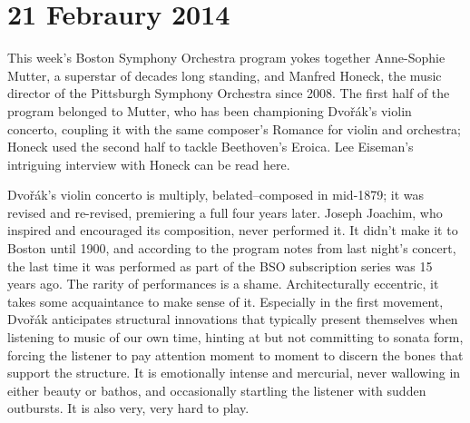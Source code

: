 \chapter{21 Febraury 2014}

This week’s Boston Symphony Orchestra program yokes together Anne-Sophie Mutter, a superstar of decades long standing, and Manfred Honeck, the music director of the Pittsburgh Symphony Orchestra since 2008. The first half of the program belonged to Mutter, who has been championing Dvořák’s violin concerto, coupling it with the same composer’s Romance for violin and orchestra; Honeck used the second half to tackle Beethoven’s Eroica. Lee Eiseman’s intriguing interview with Honeck can be read here.

Dvořák’s violin concerto is multiply, belated–composed in mid-1879; it was revised and re-revised, premiering a full four years later. Joseph Joachim, who inspired and encouraged its composition, never performed it. It didn’t make it to Boston until 1900, and according to the program notes from last night’s concert, the last time it was performed as part of the BSO subscription series was 15 years ago. The rarity of performances is a shame. Architecturally eccentric, it takes some acquaintance to make sense of it. Especially in the first movement, Dvořák anticipates structural innovations that typically present themselves when listening to music of our own time, hinting at but not committing to sonata form, forcing the listener to pay attention moment to moment to discern the bones that support the structure. It is emotionally intense and mercurial, never wallowing in either beauty or bathos, and occasionally startling the listener with sudden outbursts. It is also very, very hard to play.

